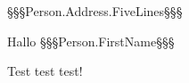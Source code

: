 ﻿\documentclass[ppsletter,fontsize=11pt,foldmarks=false ]{scrlttr2}
\begin{document}


\begin{letter}{%
    §§§Person.Address.FiveLines§§§
}

\enlargethispage{10cm}

\opening{Hallo §§§Person.FirstName§§§}

Test test test!

\end{letter}%
\end{document}
